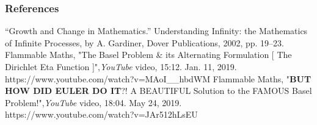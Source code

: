 \documentclass{beamer}
\begin{document}
\begin{frame}
  \frametitle{References}
  “Growth and Change in Mathematics.” Understanding Infinity: the Mathematics of Infinite Processes, by A. Gardiner, Dover Publications, 2002, pp. 19–23.
  \newline
  \newline
  Flammable Maths, "The Basel Problem \& its Alternating Formulation [ The Dirichlet Eta Function ]",\textit{YouTube} video, 15:12. Jan. 11, 2019. \newline
  https://www.youtube.com/watch?v=MAoI\_\_hbdWM
  \newline
  \newline
  Flammable Maths, "\textbf{BUT HOW DID EULER DO IT}?! A BEAUTIFUL Solution to the FAMOUS Basel Problem!",\textit{YouTube} video, 18:04. May 24, 2019. https://www.youtube.com/watch?v=JAr512hLsEU
\end{frame}
\end{document}
